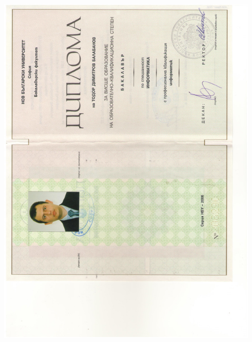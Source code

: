 \documentclass[bulgarian,a4paper]{europasscv}
\begin{document}
\includegraphics[width=\textwidth,height=\textheight,keepaspectratio]{DiplomaNBU2006_2}
\end{document}
